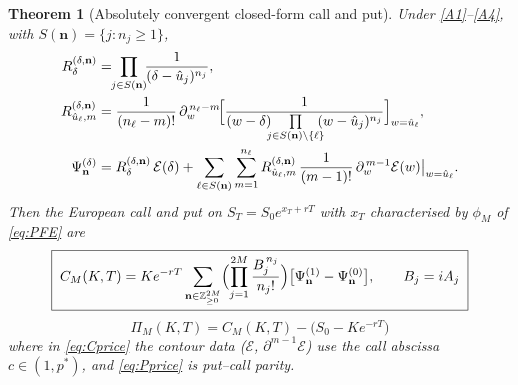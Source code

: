 \documentclass[11pt]{article}
\newtheorem{theorem}{Theorem}[section]
\newcommand{\Z}{\mathbb{Z}}
\begin{document}
\begin{theorem}[Absolutely convergent closed-form call and put]\label{thm:price}
Under \ref{A1}--\ref{A4}, with $S(\mathbf n)=\{j:n_j\ge1\}$,
\begin{align}
R^{(\delta,\mathbf n)}_\delta&=\!\!\prod_{j\in S(\mathbf n)}\!\!
\frac{1}{(\delta-\hat u_j)^{n_j}},\label{eq:Rdelta}\\
R^{(\delta,\mathbf n)}_{\hat u_\ell,m}&=\frac{1}{(n_\ell-m)!}\,
\partial_w^{\,n_\ell-m}\!\Bigl[\frac{1}{(w-\delta)\!\!\!
\prod\limits_{j\in S(\mathbf n)\setminus\{\ell\}}\!\!\!(w-\hat u_j)^{n_j}}
\Bigr]_{w=\hat u_\ell},\label{eq:Rlm}\\
\Psi^{(\delta)}_{\mathbf n}&=R^{(\delta,\mathbf n)}_\delta\,
\mathcal E(\delta)
+\sum_{\ell\in S(\mathbf n)}\sum_{m=1}^{n_\ell}
R^{(\delta,\mathbf n)}_{\hat u_\ell,m}\,\frac{1}{(m-1)!}\,
\partial_w^{\,m-1}\mathcal E(w)\big|_{w=\hat u_\ell}.\label{eq:Psi}
\end{align}
Then the European call and put on $S_T=S_0e^{x_T+rT}$ with $x_T$
characterised by $\phi_M$ of \eqref{eq:PFE} are
\begin{equation}\label{eq:Cprice}
\boxed{\;C_M(K,T)=K e^{-rT}\sum_{\mathbf n\in\Z_{\ge0}^{2M}}
\Bigl(\prod_{j=1}^{2M}\frac{B_j^{\,n_j}}{n_j!}\Bigr)
\bigl[\Psi^{(1)}_{\mathbf n}-\Psi^{(0)}_{\mathbf n}\bigr],\qquad B_j=iA_j\;}
\end{equation}
\begin{equation}\label{eq:Pprice}
\boxed{\;\Pi_M(K,T)=C_M(K,T)-\bigl(S_0-K e^{-rT}\bigr)\;}
\end{equation}
where in \eqref{eq:Cprice} the contour data ($\mathcal E$, $\partial^{m-1}
\mathcal E$) use the call abscissa $c\in(1,p^*)$, and \eqref{eq:Pprice} is
put--call parity.
\end{theorem}
\end{document}
